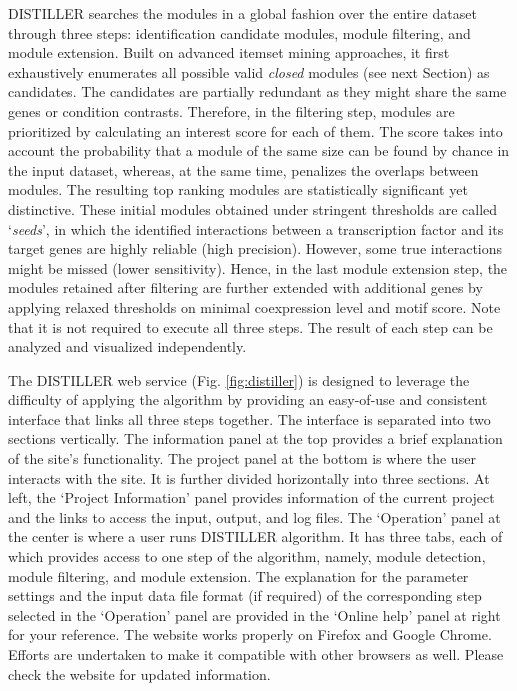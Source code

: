 DISTILLER searches the modules in a global fashion over the entire dataset
through three steps: identification candidate modules, module filtering, and
module extension.
%
Built on advanced itemset mining approaches, it first exhaustively enumerates
all possible valid \textit{closed} modules (see next Section) as candidates. The
candidates are partially redundant as they might share the same genes or
condition contrasts.
%
Therefore, in the filtering step, modules are prioritized by calculating an
interest score for each of them.  The score takes into account the probability
that a module of the same size can be found by chance in the input dataset,
whereas, at the same time, penalizes the overlaps between modules.
%
The resulting top ranking modules are statistically significant yet distinctive.
These initial modules obtained under stringent thresholds are called
`\textit{seeds}', in which the identified interactions between a transcription
factor and its target genes are highly reliable (high precision).  However, some
true interactions might be missed (lower sensitivity).
%
Hence, in the last module extension step, the modules retained after filtering
are further extended with additional genes by applying relaxed thresholds on
minimal coexpression level and motif score.
%
Note that it is not required to execute all three steps.  The result of each
step can be analyzed and visualized independently.

The DISTILLER web service \cite{DISTILLER} (Fig. \ref{fig:distiller}) is 
designed to leverage the difficulty of applying the algorithm by providing an 
easy-of-use and consistent interface that links all three steps together. 
%
The interface is separated into two sections vertically. The information panel
at the top provides a brief explanation of the site's functionality. The project
panel at the bottom is where the user interacts with the site.
%
It is further divided horizontally into three sections.  At left, the `Project
Information' panel provides information of the current project and the links to
access the input, output, and log files.
%
The `Operation' panel at the center is where a user runs DISTILLER algorithm.
It has three tabs, each of which provides access to one step of the algorithm,
namely, module detection, module filtering, and module extension.
%
The explanation for the parameter settings and the input data file format (if
required) of the corresponding step selected in the `Operation' panel are
provided in the `Online help' panel at right for your reference.  
%
The website works properly on Firefox and Google Chrome.  Efforts are undertaken
to make it compatible with other browsers as well.  Please check the website for
updated information. %

